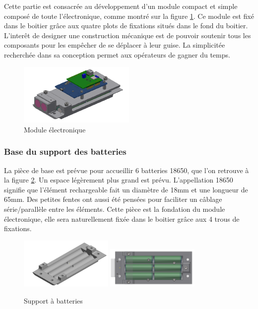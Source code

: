 Cette partie est consacrée au développement d’un module compact et simple composé de toute l'électronique, 
comme montré sur la figure \ref{fig:elmodule}.
Ce module est fixé dans le boitier grâce aux quatre plots de fixations situés dans le fond 
du boitier. L’interêt de designer une construction mécanique est de pouvoir soutenir tous les composants 
pour les empêcher de se déplacer à leur guise. La simplicitée recherchée dans sa conception permet
aux opérateurs de gagner du temps.

\begin{figure}[H]
    \centering
    \includegraphics[width=0.5\textwidth]{Images/photos_PGA/ModuleElec2-removebg-preview.png}
    \caption{Module électronique}
    \label{fig:elmodule}
\end{figure}

\subsubsection{Base du support des batteries}

La pièce de base est prévue pour accueillir 6 batteries 18650, que l'on retrouve à la figure \ref{fig:supportbatteries}.
Un espace légèrement plus grand est 
prévu. L’appellation 18650 signifie que l’élément rechargeable fait un diamètre de 18mm et une longueur 
de 65mm. Des petites fentes ont aussi été pensées pour faciliter un câblage série/parallèle entre les 
éléments. Cette pièce est la fondation du module électronique, elle sera naturellement fixée dans le 
boitier grâce aux 4 trous de fixations.

\begin{figure}[H]
    \centering
    \includegraphics[width=0.4\textwidth]{Images/photos_PGA/moduleFondbat.PNG}
    \includegraphics[width=0.4\textwidth]{Images/photos_PGA/bateriebl.PNG}
    \caption{Support à batteries}
    \label{fig:supportbatteries}
\end{figure}


